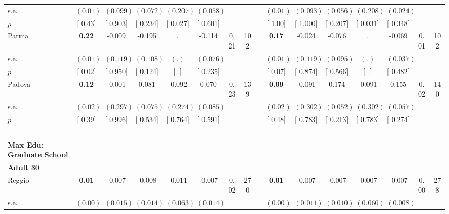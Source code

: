 \begin{longtable}{L{8em} c c c c c c c p{1em} c c c c c c c}
\quad \quad \quad \quad s.e.& $ (     0.01)$ & $ (    0.099)$ & $ (    0.072)$ & $ (    0.207)$ & $ (    0.058)$ & & & & $ (     0.01)$ & $ (    0.093)$ & $ (    0.056)$ & $ (    0.208)$ & $ (    0.024)$ & &  \\*
\quad \quad \quad \quad $ p$ & [     0.43] & [    0.903] & [    0.234] & [    0.027] & [    0.601] & & & & [     1.00] & [    1.000] & [    0.207] & [    0.031] & [    0.348] & &  \\[1em]
\quad \quad \quad Parma& \textbf{     0.22} &    -0.009 &    -0.195 &         . &    -0.114 &      0.21 &       102 & & \textbf{     0.17} &    -0.024 &    -0.076 &         . &    -0.069 &      0.01 &       102  \\*
\quad \quad \quad \quad s.e.& $ (     0.01)$ & $ (    0.119)$ & $ (    0.108)$ & $ (        .)$ & $ (    0.076)$ & & & & $ (     0.01)$ & $ (    0.119)$ & $ (    0.095)$ & $ (        .)$ & $ (    0.037)$ & &  \\*
\quad \quad \quad \quad $ p$ & [     0.02] & [    0.950] & [    0.124] & [        .] & [    0.235] & & & & [     0.07] & [    0.874] & [    0.566] & [        .] & [    0.482] & &  \\[1em]
\quad \quad \quad Padova& \textbf{     0.12} &    -0.001 &     0.081 &    -0.092 &     0.070 &      0.23 &       139 & & \textbf{     0.09} &    -0.091 &     0.174 &    -0.091 &     0.155 &      0.02 &       140  \\*
\quad \quad \quad \quad s.e.& $ (     0.02)$ & $ (    0.297)$ & $ (    0.075)$ & $ (    0.274)$ & $ (    0.085)$ & & & & $ (     0.02)$ & $ (    0.302)$ & $ (    0.052)$ & $ (    0.302)$ & $ (    0.057)$ & &  \\*
\quad \quad \quad \quad $ p$ & [     0.39] & [    0.996] & [    0.534] & [    0.764] & [    0.591] & & & & [     0.48] & [    0.783] & [    0.213] & [    0.783] & [    0.274] & &  \\[1em]
~\\[1em]
\textbf{Max Edu: Graduate School} \\*
\quad \quad \textbf{Adult 30} & & & & & & & & & & & & & & & \\* 
\quad \quad \quad Reggio& \textbf{     0.01} &    -0.007 &    -0.008 &    -0.011 &    -0.007 &      0.02 &       270 & & \textbf{     0.01} &    -0.007 &    -0.007 &    -0.007 &    -0.007 &      0.00 &       278  \\*
\quad \quad \quad \quad s.e.& $ (     0.00)$ & $ (    0.015)$ & $ (    0.014)$ & $ (    0.063)$ & $ (    0.014)$ & & & & $ (     0.00)$ & $ (    0.011)$ & $ (    0.010)$ & $ (    0.060)$ & $ (    0.008)$ & &  \\*

\end{longtable}
